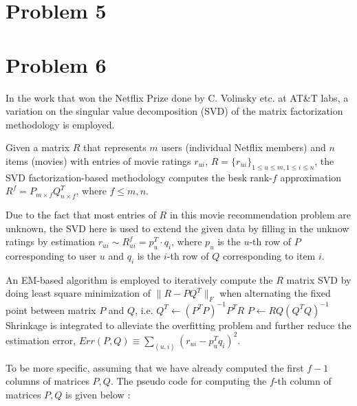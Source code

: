 \documentclass{article}
\begin{document}
\newpage
\section*{Problem 5}















\newpage
\section*{Problem 6}
\hspace{12 pt} In the work that won the Netflix Prize done by C. Volinsky etc. at AT\&T labs, a variation
on the singular value decomposition (SVD) of the matrix factorization methodology is employed.

Given a matrix $R$ that represents $m$ users (individual Netflix members) and $n$ items (movies)
with entries of movie ratings $r_{ui}$, $R=\{r_{ui}\}_{1\leq u\leq m, 1\leq i\leq n}$,
the SVD factorization-based methodology computes the besk rank-$f$ approximation
$R^f=P_{m\times f}Q_{n\times f}^T$, where $f\leq m,n$.

Due to the fact that most entries of $R$ in this movie recommendation problem are unknown,
the SVD here is used to extend the given data by filling in the unknow ratings by estimation 
$r_{ui} \sim R_{ui}^f = p_u^T \cdot q_i$, where $p_u$ is the $u$-th row of $P$ corresponding to user $u$
and $q_i$ is the $i$-th row of $Q$ corresponding to item $i$.

An EM-based algorithm is employed to iteratively compute the $R$ matrix SVD by doing
least square minimization of $\|R-PQ^T\|_F$ when alternating the fixed point between
matrix $P$ and $Q$, i.e. \newline
$Q^T \leftarrow (P^TP)^{-1}P^TR$ \newline
$P \leftarrow RQ(Q^TQ)^{-1}$\newline
Shrinkage is integrated to alleviate the overfitting problem and further reduce the estimation error,\newline
$Err(P,Q)\equiv \displaystyle\sum_{(u,i)}(r_{ui}-p_u^Tq_i)^2$.

To be more specific, assuming that we have already computed the first $f-1$ columns of
matrices $P,Q$. The pseudo code for computing the $f$-th column of matrices $P,Q$ is given below
\cite{KDD07}:
\end{document}
